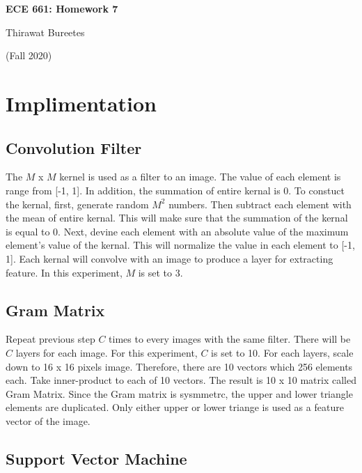 \documentclass[11pt]{article}
\begin{document}
\begin{center}
\Large{\textbf{ECE 661: Homework 7}}

Thirawat Bureetes

(Fall 2020)
\end{center}
	
 


\section*{Implimentation}


\subsection*{Convolution Filter}

The $M$ x $M$ kernel is used as a filter to an image. The value of each element is range from [-1, 1]. In addition, the summation of entire kernal is 0. To constuct the kernal, first, generate random $M^2$ numbers. Then subtract each element with the mean of entire kernal. This will make sure that the summation of the kernal is equal to 0. Next, devine each element with an absolute value of the maximum element's value of the kernal. This will normalize the value in each element to [-1, 1]. Each kernal will convolve with an image to produce a layer for extracting feature. In this experiment, $M$ is set to 3.
 

\subsection*{Gram Matrix}

Repeat previous step $C$ times to every images with the same filter. There will be $C$ layers for each image. For this experiment, $C$ is set to 10. For each layers, scale down to 16 x 16 pixels image. Therefore, there are 10 vectors which 256 elements each. Take inner-product to each of 10 vectors. The result is 10 x 10 matrix called Gram Matrix. Since the Gram matrix is sysmmetrc, the upper and lower triangle elements are duplicated. Only either upper or lower triange is used as a feature vector of the image. 


\subsection*{Support Vector Machine}
\end{document}
